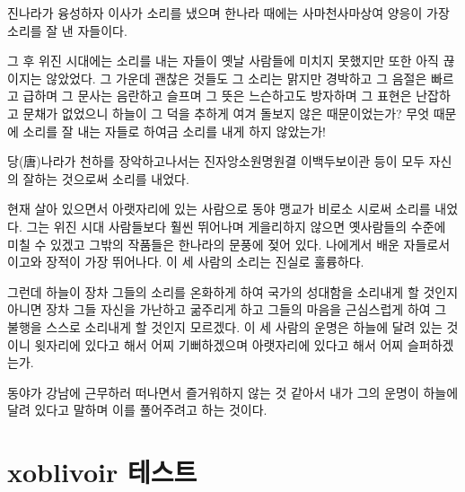 \documentclass[demo,chapter,openany,amsmath,gremph,adjustmath]{oblivoir}
\begin{document}
진나라가 융성하자 이사가 소리를 냈으며 한나라 때에는 사마천\cntrdot 사마상여\cntrdot 
양응이 가장 소리를 잘 낸 자들이다.

그 후 위\cntrdot 진 시대에는 소리를 내는 자들이 옛날 사람들에 미치지 못했지만
또한 아직 끊이지는 않았었다. 그 가운데 괜찮은 것들도 그 소리는 맑지만
경박하고 그 음절은 빠르고 급하며 그 문사는 음란하고 슬프며
그 뜻은 느슨하고도 방자하며 그 표현은 난잡하고 문채가 없었으니
하늘이 그 덕을 추하게 여겨 돌보지 않은 때문이었는가? 무엇 때문에
소리를 잘 내는 자들로 하여금 소리를 내게 하지 않았는가!

당(唐)나라가 천하를 장악하고나서는 진자앙\cntrdot 소원명\cntrdot 원결\cntrdot 
이백\cntrdot 두보\cntrdot 이관 등이 모두 자신의 잘하는 것으로써 소리를 내었다.

현재 살아 있으면서 아랫자리에 있는 사람으로 동야 맹교가 비로소 시로써
소리를 내었다. 그는 위\cntrdot 진 시대 사람들보다 훨씬 뛰어나며
게을리하지 않으면 옛사람들의 수준에 미칠 수 있겠고
그밖의 작품들은 한나라의 문풍에 젖어 있다. 나에게서 배운 자들로서
이고와 장적이 가장 뛰어나다. 이 세 사람의 소리는 진실로 훌륭하다.

그런데 하늘이 장차 그들의 소리를 온화하게 하여 국가의 성대함을 소리내게
할 것인지 아니면 장차 그들 자신을 가난하고 굶주리게 하고
그들의 마음을 근심스럽게 하여 그 불행을 스스로 소리내게 할 것인지 모르겠다.
이 세 사람의 운명은 하늘에 달려 있는 것이니 윗자리에 있다고 해서 어찌
기뻐하겠으며 아랫자리에 있다고 해서 어찌 슬퍼하겠는가.

동야가 강남에 근무하러 떠나면서 즐거워하지 않는 것 같아서 내가 그의
운명이 하늘에 달려 있다고 말하며 이를 풀어주려고 하는 것이다.


\part{xoblivoir 테스트}

\pagestyle{companion}
\end{document}
